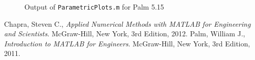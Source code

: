 \documentclass{article}
\begin{document}
\begin{figure}[htb!]
\begin{center}
\caption{Output of {\tt ParametricPlots.m} for Palm 5.15}
\end{center}
\end{figure}
\clearpage



\clearpage

\begin{thebibliography}{9}
  Chapra, Steven C.,
  {\it Applied Numerical Methods with MATLAB for Engineering and Scientists}.
  McGraw-Hill, New York,
  3rd Edition,
  2012.
  Palm, William J.,
  {\it Introduction to MATLAB for Engineers}.
  McGraw-Hill, New York,
  3rd Edition,
  2011.
\end{thebibliography}
\end{document}
